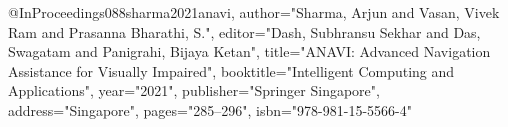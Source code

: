 @InProceedings{088sharma2021anavi,
author="Sharma, Arjun
and Vasan, Vivek Ram
and Prasanna Bharathi, S.",
editor="Dash, Subhransu Sekhar
and Das, Swagatam
and Panigrahi, Bijaya Ketan",
title="ANAVI: Advanced Navigation Assistance for Visually Impaired",
booktitle="Intelligent Computing and Applications",
year="2021",
publisher="Springer Singapore",
address="Singapore",
pages="285--296",
isbn="978-981-15-5566-4"
}